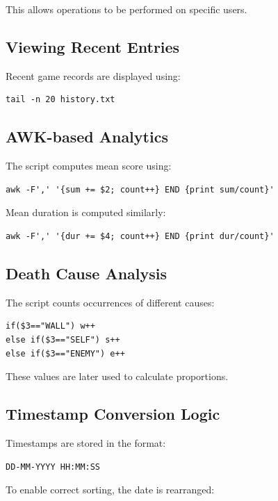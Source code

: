 \documentclass[12pt,a4paper]{article}
\begin{document}
This allows operations to be performed on specific users.

\subsection{Viewing Recent Entries}

Recent game records are displayed using:

\begin{lstlisting}
tail -n 20 history.txt
\end{lstlisting}

\subsection{AWK-based Analytics}

The script computes mean score using:

\begin{lstlisting}
awk -F',' '{sum += $2; count++} END {print sum/count}'
\end{lstlisting}

Mean duration is computed similarly:

\begin{lstlisting}
awk -F',' '{dur += $4; count++} END {print dur/count}'
\end{lstlisting}

\subsection{Death Cause Analysis}

The script counts occurrences of different causes:

\begin{lstlisting}
if($3=="WALL") w++
else if($3=="SELF") s++
else if($3=="ENEMY") e++
\end{lstlisting}

These values are later used to calculate proportions.

\subsection{Timestamp Conversion Logic}

Timestamps are stored in the format:

\begin{verbatim}
DD-MM-YYYY HH:MM:SS
\end{verbatim}

To enable correct sorting, the date is rearranged:
\end{document}
